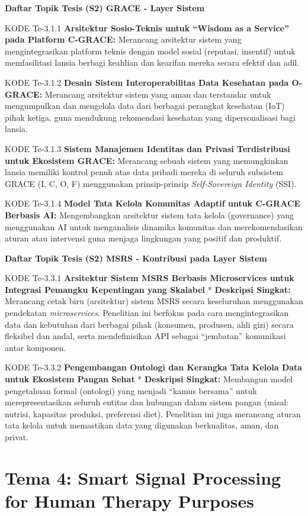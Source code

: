 \documentclass[
  letterpaper,
  DIV=11,
  numbers=noendperiod]{scrreprt}
\begin{document}
\textbf{Daftar Topik Tesis (S2) GRACE - Layer Sistem}

KODE Te-3.1.1 \textbf{Arsitektur Sosio-Teknis untuk ``Wisdom as a
Service'' pada Platform C-GRACE:} Merancang arsitektur sistem yang
mengintegrasikan platform teknis dengan model sosial (reputasi,
insentif) untuk memfasilitasi lansia berbagi keahlian dan kearifan
mereka secara efektif dan adil.

KODE Te-3.1.2 \textbf{Desain Sistem Interoperabilitas Data Kesehatan
pada O-GRACE:} Merancang arsitektur sistem yang aman dan terstandar
untuk mengumpulkan dan mengelola data dari berbagai perangkat kesehatan
(IoT) pihak ketiga, guna mendukung rekomendasi kesehatan yang
dipersonalisasi bagi lansia.

KODE Te-3.1.3 \textbf{Sistem Manajemen Identitas dan Privasi
Terdistribusi untuk Ekosistem GRACE:} Merancang sebuah sistem yang
memungkinkan lansia memiliki kontrol penuh atas data pribadi mereka di
seluruh subsistem GRACE (I, C, O, F) menggunakan prinsip-prinsip
\emph{Self-Sovereign Identity} (SSI).

KODE Te-3.1.4 \textbf{Model Tata Kelola Komunitas Adaptif untuk C-GRACE
Berbasis AI:} Mengembangkan arsitektur sistem tata kelola (governance)
yang menggunakan AI untuk menganalisis dinamika komunitas dan
merekomendasikan aturan atau intervensi guna menjaga lingkungan yang
positif dan produktif.

\textbf{Daftar Topik Tesis (S2) MSRS - Kontribusi pada Layer Sistem}

KODE Te-3.3.1 \textbf{Arsitektur Sistem MSRS Berbasis Microservices
untuk Integrasi Pemangku Kepentingan yang Skalabel} * \textbf{Deskripsi
Singkat:} Merancang cetak biru (arsitektur) sistem MSRS secara
keseluruhan menggunakan pendekatan \emph{microservices}. Penelitian ini
berfokus pada cara mengintegrasikan data dan kebutuhan dari berbagai
pihak (konsumen, produsen, ahli gizi) secara fleksibel dan andal, serta
mendefinisikan API sebagai ``jembatan'' komunikasi antar komponen.

KODE Te-3.3.2 \textbf{Pengembangan Ontologi dan Kerangka Tata Kelola
Data untuk Ekosistem Pangan Sehat} * \textbf{Deskripsi Singkat:}
Membangun model pengetahuan formal (ontologi) yang menjadi ``kamus
bersama'' untuk merepresentasikan seluruh entitas dan hubungan dalam
sistem pangan (misal: nutrisi, kapasitas produksi, preferensi diet).
Penelitian ini juga merancang aturan tata kelola untuk memastikan data
yang digunakan berkualitas, aman, dan privat.

\section{Tema 4: Smart Signal Processing for Human Therapy
Purposes}\label{tema-4-smart-signal-processing-for-human-therapy-purposes-1}
\end{document}
